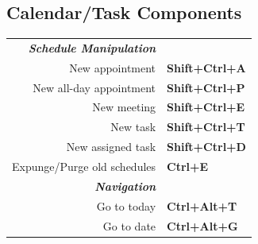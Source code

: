 \documentclass[12pt]{article}
\begin{document}
\begin{landscape}
\begin{center}
\begin{multicols}{2}
	\section*{Calendar/Task Components}
	\begin{tabular*}{4in}{rp{1.5in}}
		\textit{\textbf{Schedule Manipulation}}	&					\\
		New appointment				& \textbf{Shift+Ctrl+A}			\\
		New all-day appointment			& \textbf{Shift+Ctrl+P}			\\
		New meeting				& \textbf{Shift+Ctrl+E}			\\
		New task				& \textbf{Shift+Ctrl+T}			\\
		New assigned task			& \textbf{Shift+Ctrl+D}			\\
		\vspace{1.5mm}
		Expunge/Purge old schedules		& \textbf{Ctrl+E}			\\
		\textit{\textbf{Navigation}}		&					\\
		Go to today				& \textbf{Ctrl+Alt+T}			\\
		Go to date				& \textbf{Ctrl+Alt+G}			\\
	\end{tabular*}

\end{multicols}
\end{center}
\end{landscape}
\end{document}
